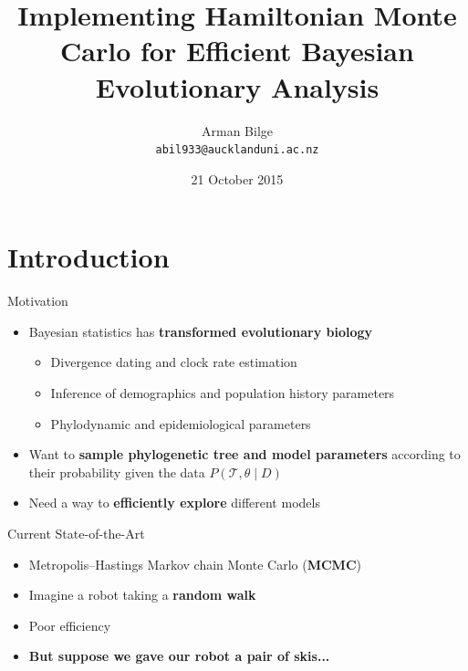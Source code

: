 \documentclass{beamer}
\title{Implementing Hamiltonian Monte Carlo for Efficient Bayesian Evolutionary Analysis}
\author{Arman Bilge \\ \small\texttt{abil933@aucklanduni.ac.nz}}
\institute{Computational Evolution Group \\ The University of Auckland}
\date{21 October 2015}
\begin{document}
    \frame{\titlepage}

    \section{Introduction}

    \begin{frame}{Motivation}

        \begin{itemize}

            \item Bayesian statistics has \textbf{transformed evolutionary biology}
            \begin{itemize}
                \item Divergence dating and clock rate estimation
                \item Inference of demographics and population history parameters
                \item Phylodynamic and epidemiological parameters
            \end{itemize}

            \item Want to \textbf{sample phylogenetic tree and model parameters} according to their probability given the data $P\left(\mathcal{T}, \theta \mid D\right)$

            \item Need a way to \textbf{efficiently explore} different models

        \end{itemize}

    \end{frame}

    \begin{frame}{Current State-of-the-Art}
        \begin{itemize}
            \item Metropolis--Hastings Markov chain Monte Carlo (\textbf{MCMC})
            \item Imagine a robot taking a \textbf{random walk}
            \item Poor efficiency \pause
            \item \textbf{But suppose we gave our robot a pair of skis...}
        \end{itemize}
    \end{frame}
\end{document}
